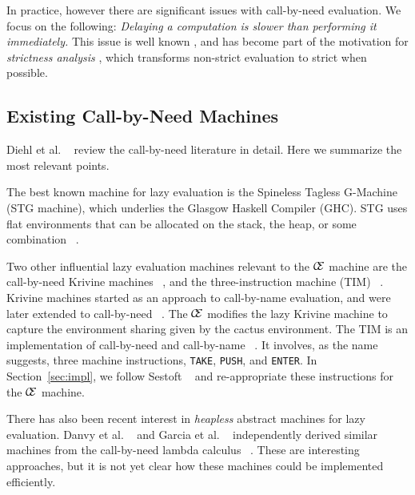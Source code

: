 In practice, however there are significant issues with call-by-need evaluation.
We focus on the following: \emph{Delaying a computation is slower than
performing it immediately.} This issue is well known
\cite{johnsson1984efficient,jonesstg}, and has become part of the motivation
for \emph{strictness analysis}
\cite{mycroft1982abstract,wadler1987projections}, which transforms non-strict
evaluation to strict when possible.

\subsection{Existing Call-by-Need Machines}

Diehl et al. ~\cite{diehl2000abstract} review the call-by-need
literature in detail.  Here we summarize the most relevant points.

The best known machine for lazy evaluation is the Spineless Tagless
G-Machine (STG machine), which underlies the Glasgow Haskell Compiler (GHC). 
STG uses flat environments that can be allocated on the stack, the heap,
or some combination ~\cite{jonesstg}.  

Two other influential lazy evaluation machines relevant to the $\mathcal{\mathcal{C} \mskip -4mu \mathcal{E}}$
machine are the call-by-need Krivine machines
~\cite{lkm,krivine2007call,sestoft}, and the three-instruction machine (TIM)
~\cite{TIM}.  Krivine machines started as an approach to call-by-name
evaluation, and were later extended to call-by-need
~\cite{krivine2007call,sestoft,danvy2013synthetic,lkm}.  The $\mathcal{\mathcal{C} \mskip -4mu \mathcal{E}}$
modifies the lazy Krivine machine to capture the environment sharing given by
the cactus environment. The TIM is an implementation of call-by-need and
call-by-name ~\cite{TIM}.  It involves, as the name suggests, three machine
instructions, \texttt{TAKE}, \texttt{PUSH}, and \texttt{ENTER}. In
Section~\ref{sec:impl}, we follow Sestoft ~\cite{sestoft} and
re-appropriate these instructions for the $\mathcal{\mathcal{C} \mskip -4mu \mathcal{E}}$ machine.

There has also been recent interest in \emph{heapless} abstract
machines for lazy evaluation. Danvy et al. ~\cite{danvy2012inter} and
Garcia et al. ~\cite{garcia2009lazy} independently derived similar
machines from the call-by-need lambda calculus
~\cite{ariola1995call}. These are interesting approaches, but it is not yet
clear how these machines could be implemented efficiently.
